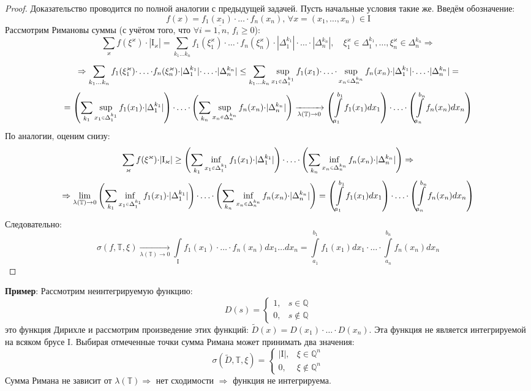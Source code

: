 \documentclass[12pt]{article}
\newcommand{\MQ}{\mathbb{Q}}
\newcommand{\MTB}{\mathbb{T}}
\newcommand{\MI}{\mathrm{I}}
\theoremstyle{definition}
\newcommand{\ddsum}[2]{\displaystyle\sum\limits_{#1}^{#2}}
\newcommand{\ddint}[2]{\displaystyle\int\limits_{#1}^{#2}}
\newcommand{\smallerrel}[1]{\mathrel{\mathpalette\smallerrelaux{#1}}}
\newcommand{\smallerrelaux}[2]{\raisebox{.1ex}{\scalebox{.75}{$#1#2$}}}
\newcommand{\smallin}{\smallerrel{\in}}
\newcommand{\wte}[1]{\widetilde{#1}}
\begin{document}
\begin{proof}
	Доказательство проводится по полной аналогии с предыдущей задачей. Пусть начальные условия такие же. Введём обозначение:
	$$
		f(x) = f_1(x_1){\cdot}\dotsc{\cdot}f_n(x_n), \, \forall x = (x_1,\dotsc,x_n) \in \MI
	$$
	Рассмотрим Римановы суммы (с учётом того, что $\forall i = \overline{1,n}, \, f_i \geq 0$):
	$$
		\ddsum{\varkappa}{}f(\xi^{\varkappa}){\cdot}|\MI_{\varkappa}| = \ddsum{k_1 \dotsc k_n}{}f_1(\xi_1^{\varkappa}){\cdot}\dotsc{\cdot}f_n(\xi_n^{\varkappa}){\cdot}|\Delta_1^{k_1}|{\cdot}\dotsc{\cdot}|\Delta_n^{k_n}|, \quad \xi_1^{\varkappa} \in \Delta_1^{k_1}, \dotsc, \xi_n^{\varkappa} \in \Delta_n^{k_n} \Rightarrow
	$$
	$$
		\Rightarrow \ddsum{k_1 \dotsc k_n}{}f_1(\xi_1^{\varkappa}){\cdot}\dotsc{\cdot}f_n(\xi_n^{\varkappa}){\cdot}|\Delta_1^{k_1}|{\cdot}\dotsc{\cdot}|\Delta_n^{k_n}| \leq \ddsum{k_1 \dotsc k_n}{} \sup\limits_{x_1 \smallin \Delta_1^{k_1}}f_1(x_1){\cdot}\dotsc{\cdot}\sup\limits_{x_n \smallin\Delta_n^{k_n}}f_n(x_n){\cdot}|\Delta_1^{k_1}|{\cdot}\dotsc{\cdot}|\Delta_n^{k_n}| = 
	$$
	$$
		= \left(\ddsum{k_1}{}\sup\limits_{x_1 \smallin \Delta_1^{k_1}}f_1(x_1){\cdot}|\Delta_1^{k_1}|\right){\cdot}\dotsc{\cdot}\left(\ddsum{k_n}{}\sup\limits_{x_n \smallin \Delta_n^{k_n}}f_n(x_n){\cdot}|\Delta_n^{k_n}|\right) \xrightarrow[\lambda(\MTB) \to 0]{} \left(\ddint{a_1}{b_1}f_1(x_1)dx_1 \right){\cdot}\dotsc{\cdot}\left(\ddint{a_n}{b_n}f_n(x_n)dx_n \right)
	$$
	По аналогии, оценим снизу:
	$$
		\ddsum{\varkappa}{}f(\xi^{\varkappa}){\cdot}|\MI_{\varkappa}| \geq \left(\ddsum{k_1}{}\inf_{x_1 \smallin \Delta_1^{k_1}}f_1(x_1){\cdot}|\Delta_1^{k_1}|\right){\cdot} \dotsc {\cdot}\left(\ddsum{k_n}{}\inf_{x_n \smallin\Delta_n^{k_n}}f_n(x_n){\cdot}|\Delta_n^{k_n}|\right) \Rightarrow 
	$$
	$$	
		\Rightarrow \lim\limits_{\lambda(\MTB)\to 0} \left(\ddsum{k_1}{}\inf_{x_1 \smallin \Delta_1^{k_1}}f_1(x_1){\cdot}|\Delta_1^{k_1}|\right){\cdot} \dotsc {\cdot}\left(\ddsum{k_n}{}\inf_{x_n \smallin\Delta_n^{k_n}}f_n(x_n){\cdot}|\Delta_n^{k_n}|\right) = \left(\ddint{a_1}{b_1}f_1(x_1)dx_1 \right){\cdot}\dotsc{\cdot}\left(\ddint{a_n}{b_n}f_n(x_n)dx_n \right)
	$$
	Следовательно: 
	$$
		\sigma\left(f,\MTB,\xi\right) \xrightarrow[\lambda(\MTB) \to 0]{} \ddint{\MI}{}f_1(x_1){\cdot}\dotsc{\cdot} f_n(x_n)dx_1 \dotsc dx_n = \ddint{a_1}{b_1}f_1(x_1)dx_1{\cdot}\dotsc{\cdot}\ddint{a_n}{b_n}f_n(x_n)dx_n
	$$
\end{proof}

\textbf{Пример}: Рассмотрим неинтегрируемую функцию: 
$$
	D(s) = \begin{cases}
		1, & s \in \MQ \\
		0, & s \not\in \MQ
	\end{cases}
$$
это функция Дирихле и рассмотрим произведение этих функций: $\wte{D}(x) = D(x_1){\cdot}\dotsc{\cdot}D(x_n)$. Эта функция не является интегрируемой на всяком брусе $\MI$. Выбирая отмеченные точки сумма Римана может принимать два значения:
$$
	\sigma\left(\wte{D},\MTB,\xi\right) = \begin{cases}
		|\MI|, & \xi \in \MQ^n\\
		0, & \xi \not\in \MQ^n
	\end{cases}
$$
Сумма Римана не зависит от $\lambda(\MTB) \Rightarrow$ нет сходимости $\Rightarrow$ функция не интегрируема.
\end{document}
